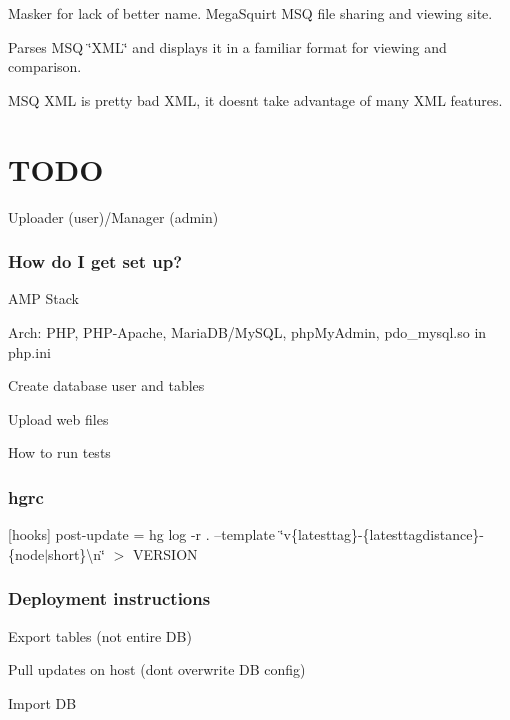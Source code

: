 \textquotesingle{}Masker\textquotesingle{} for lack of better name. Mega\+Squirt M\+S\+Q file sharing and viewing site.

Parses M\+S\+Q \char`\"{}\+X\+M\+L\char`\"{} and displays it in a familiar format for viewing and comparison.

M\+S\+Q X\+M\+L is pretty bad X\+M\+L, it doesn\textquotesingle{}t take advantage of many X\+M\+L features.

\section*{T\+O\+D\+O}

Uploader (user)/\+Manager (admin)

\subsubsection*{How do I get set up?}


\begin{DoxyItemize}
\item A\+M\+P Stack
\item Arch\+: P\+H\+P, P\+H\+P-\/\+Apache, Maria\+D\+B/\+My\+S\+Q\+L, php\+My\+Admin, pdo\+\_\+mysql.\+so in php.\+ini
\item Create database user and tables
\item Upload web files
\item How to run tests
\end{DoxyItemize}

\subsubsection*{hgrc}

\mbox{[}hooks\mbox{]} post-\/update = hg log -\/r . --template \char`\"{}v\{latesttag\}-\/\{latesttagdistance\}-\/\{node$\vert$short\}\textbackslash{}n\char`\"{} $>$ V\+E\+R\+S\+I\+O\+N

\subsubsection*{Deployment instructions}


\begin{DoxyItemize}
\item Export tables (not entire D\+B)
\item Pull updates on host (don\textquotesingle{}t overwrite D\+B config)
\item Import D\+B
\end{DoxyItemize}

